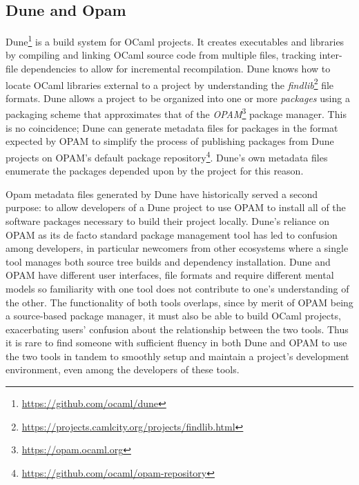 \documentclass{article}
\begin{document}
    \begin{multicols}{2}

        \section{Dune and Opam}

        Dune\footnote{\url{https://github.com/ocaml/dune}} is a build system for OCaml
        projects. It creates executables and libraries by compiling and linking
        OCaml source code from multiple files, tracking inter-file dependencies
        to allow for incremental recompilation. Dune knows how to locate OCaml
        libraries external to a project by understanding the
        \textit{findlib}\footnote{\url{https://projects.camlcity.org/projects/findlib.html}}
        file formats. Dune allows a project to be organized into one or more
        \textit{packages} using a packaging scheme that approximates that of the
        \textit{OPAM}\footnote{\url{https://opam.ocaml.org}} package manager. This is
        no coincidence; Dune can generate metadata files for packages in the
        format expected by OPAM to simplify the process of publishing packages
        from Dune projects on OPAM's default package
        repository\footnote{\url{https://github.com/ocaml/opam-repository}}. Dune's
        own metadata files enumerate the packages depended upon by the project
        for this reason.

        Opam metadata files generated by Dune have historically served a second
        purpose: to allow developers of a Dune project to use OPAM to
        install all of the software packages necessary to build their
        project locally. Dune's reliance on OPAM as its de facto standard
        package management tool has led to confusion among developers, in
        particular newcomers from other ecosystems where a single tool
        manages both source tree builds and dependency installation. Dune
        and OPAM have different user interfaces, file formats and require
        different mental models so familiarity with one tool does not
        contribute to one's understanding of the other. The functionality
        of both tools overlaps, since by merit of OPAM being a source-based
        package manager, it must also be able to build OCaml projects,
        exacerbating users' confusion about the relationship between the
        two tools. Thus it is rare to find someone with sufficient fluency
        in both Dune and OPAM to use the two tools in tandem to smoothly
        setup and maintain a project's development environment, even among
        the developers of these tools.


\end{multicols}
\end{document}
